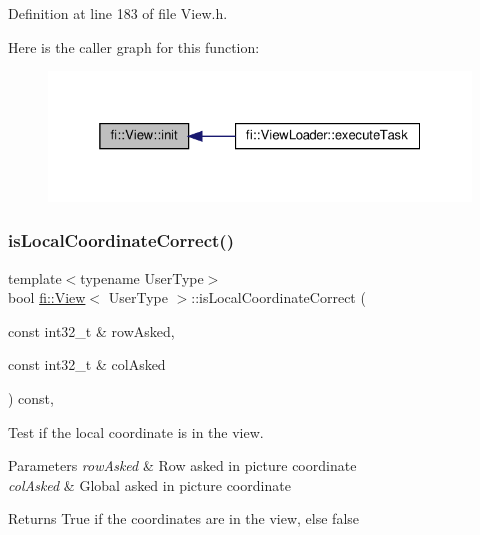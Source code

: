 Definition at line 183 of file View.\+h.

Here is the caller graph for this function\+:
\nopagebreak
\begin{figure}[H]
\begin{center}
\leavevmode
\includegraphics[width=325pt]{d5/dd4/classfi_1_1View_a45cf9767af7b68e813e166d24acab720_icgraph}
\end{center}
\end{figure}
\mbox{\label{classfi_1_1View_a227f31e08d755d67e364967ceb3a1758}} 
\subsubsection{\texorpdfstring{is\+Local\+Coordinate\+Correct()}{isLocalCoordinateCorrect()}}
{\footnotesize\ttfamily template$<$typename User\+Type$>$ \\
bool \hyperlink{classfi_1_1View}{fi\+::\+View}$<$ User\+Type $>$\+::is\+Local\+Coordinate\+Correct (\begin{DoxyParamCaption}\item[{const int32\+\_\+t \&}]{row\+Asked,  }\item[{const int32\+\_\+t \&}]{col\+Asked }\end{DoxyParamCaption}) const\hspace{0.3cm}{\ttfamily [inline]}, {\ttfamily [private]}}



Test if the local coordinate is in the view. 


\begin{DoxyParams}{Parameters}
{\em row\+Asked} & Row asked in picture coordinate \\
\hline
{\em col\+Asked} & Global asked in picture coordinate \\
\hline
\end{DoxyParams}
\begin{DoxyReturn}{Returns}
True if the coordinates are in the view, else false 
\end{DoxyReturn}


